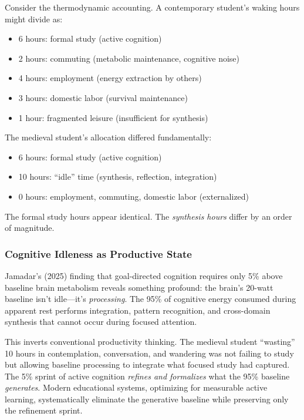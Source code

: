 Consider the thermodynamic accounting. A contemporary student's waking hours might divide as:
\begin{itemize}
    \item 6 hours: formal study (active cognition)
    \item 2 hours: commuting (metabolic maintenance, cognitive noise)
    \item 4 hours: employment (energy extraction by others)
    \item 3 hours: domestic labor (survival maintenance)
    \item 1 hour: fragmented leisure (insufficient for synthesis)
\end{itemize}

The medieval student's allocation differed fundamentally:
\begin{itemize}
    \item 6 hours: formal study (active cognition)
    \item 10 hours: ``idle'' time (synthesis, reflection, integration)
    \item 0 hours: employment, commuting, domestic labor (externalized)
\end{itemize}

The formal study hours appear identical. The \textit{synthesis hours} differ by an order of magnitude.

\subsubsection{Cognitive Idleness as Productive State}

Jamadar's (2025) finding that goal-directed cognition requires only 5\% above baseline brain metabolism reveals something profound: the brain's 20-watt baseline isn't idle---it's \textit{processing}. The 95\% of cognitive energy consumed during apparent rest performs integration, pattern recognition, and cross-domain synthesis that cannot occur during focused attention.

This inverts conventional productivity thinking. The medieval student ``wasting'' 10 hours in contemplation, conversation, and wandering was not failing to study but allowing baseline processing to integrate what focused study had captured. The 5\% sprint of active cognition \textit{refines and formalizes} what the 95\% baseline \textit{generates}. Modern educational systems, optimizing for measurable active learning, systematically eliminate the generative baseline while preserving only the refinement sprint.

